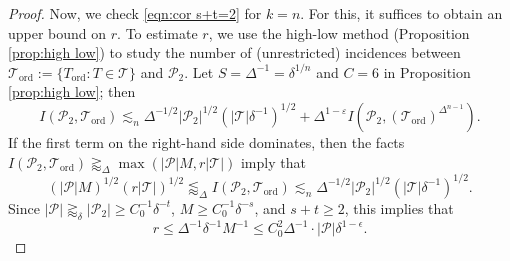 \documentclass{amsart}
\newcommand{\T}{\mathcal{T}}
\newcommand{\eps}{\varepsilon}
\newcommand{\leapp}{\lessapprox}
\newcommand{\geapp}{\gtrapprox}
\newcommand{\lesim}{\lesssim}
\newcommand{\bp}{\mathbf{p}}
\newcommand{\bT}{\mathbf{T}}
\newcommand{\cD}{\mathcal{D}}
\newcommand{\cT}{\mathcal{T}}
\newcommand{\cP}{\mathcal{P}}
\newcommand{\ord}{\mathrm{ord}}
\begin{document}
\begin{proof}



Now, we check \eqref{eqn:cor s+t=2} for $k = n$. For this, it suffices to obtain an upper bound on $r$. To estimate $r$, we use the high-low method (Proposition \ref{prop:high low}) to study the number of (unrestricted) incidences between $\cT_\ord := \{ T_\ord : T \in \cT \}$ and $\cP_2$.  Let $S = \Delta^{-1} = \delta^{1/n}$ and $C = 6$ in Proposition \ref{prop:high low}; then
\begin{equation}\label{eqn:prop 4.2 high low}
    I(\cP_2, \T_\ord) \lesim_n \Delta^{-1/2} |\cP_2|^{1/2} (|\cT| \delta^{-1})^{1/2} + \Delta^{1-\eps} I(\cP_2, (\T_\ord)^{\Delta^{n-1}}).
\end{equation}
If the first term on the right-hand side dominates, then the facts $I(\cP_2, \T_\ord) \geapp_\Delta \max(|\cP|M, r |\cT|)$ imply that
\[
(|\cP|M)^{1/2} (r |\cT|)^{1/2} \leapp_\Delta I(\cP_2, \T_\ord) \lesim_n \Delta^{-1/2} |\cP_2|^{1/2} (|\cT| \delta^{-1})^{1/2}.
\]
Since $|\cP|\gtrapprox_{\delta} |\cP_2| \ge C_0^{-1} \delta^{-t}$, $M \ge C_0^{-1} \delta^{-s}$, and $s + t \ge 2$, this implies that 
\[
r \leq \Delta^{-1} \delta^{-1} M^{-1}\leq C_0^2 \Delta^{-1} \cdot |\cP| \delta^{1-\epsilon}.
\]


\end{proof}
\end{document}
